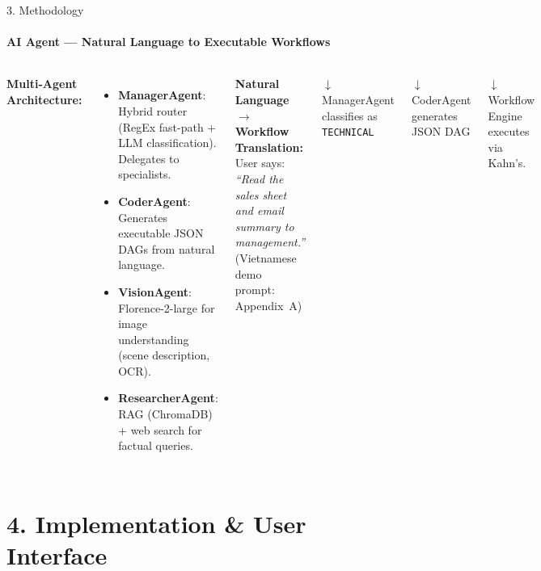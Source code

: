 \documentclass[10pt,aspectratio=169]{beamer}
\begin{document}
\begin{frame}{3. Methodology}
    \framesubtitle{AI Agent --- Natural Language to Executable Workflows}

    \begin{columns}
        \textbf{Multi-Agent Architecture:}
        \begin{itemize}
            \item \textbf{ManagerAgent}: Hybrid router (RegEx fast-path + LLM classification). Delegates to specialists.
            \item \textbf{CoderAgent}: Generates executable JSON DAGs from natural language.
            \item \textbf{VisionAgent}: Florence-2-large for image understanding (scene description, OCR).
            \item \textbf{ResearcherAgent}: RAG (ChromaDB) + web search for factual queries.
        \end{itemize}

        \textbf{Natural Language $\rightarrow$ Workflow Translation:}\\[0.2cm]
        User says: \textit{``Read the sales sheet and email summary to management.''}\\
        {\scriptsize(Vietnamese demo prompt: Appendix~A)}

        \vspace{0.2cm}
        $\downarrow$ ManagerAgent classifies as \texttt{TECHNICAL}

        $\downarrow$ CoderAgent generates JSON DAG
        
        \vspace{0.2cm}
        \normalsize
        $\downarrow$ Workflow Engine executes via Kahn's.

       
    \end{columns}
\end{frame}

\section{4. Implementation \& User Interface}
\end{document}
